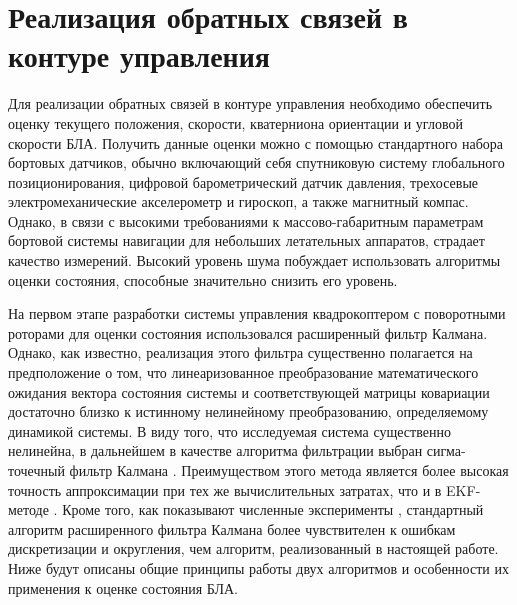 \chapter{Реализация обратных связей в контуре управления}

Для реализации обратных связей в контуре управления необходимо обеспечить оценку текущего положения, скорости, кватерниона ориентации и угловой скорости БЛА. Получить данные оценки можно с помощью стандартного набора бортовых датчиков, обычно включающий себя спутниковую систему глобального позиционирования, цифровой барометрический датчик давления, трехосевые электромеханические акселерометр и гироскоп, а также магнитный компас. Однако, в связи с высокими требованиями к массово-габаритным параметрам бортовой системы навигации для небольших летательных аппаратов, страдает качество измерений. Высокий уровень шума побуждает использовать алгоритмы оценки состояния, способные значительно снизить его уровень.

На первом этапе разработки системы управления квадрокоптером с поворотными роторами для оценки состояния использовался расширенный фильтр Калмана. Однако, как известно, реализация этого фильтра существенно полагается на предположение о том, что линеаризованное преобразование математического ожидания вектора состояния системы и соответствующей матрицы ковариации достаточно близко к истинному нелинейному преобразованию, определяемому динамикой системы. В виду того, что исследуемая система существенно нелинейна, в дальнейшем в качестве алгоритма фильтрации выбран сигма-точечный фильтр Калмана \cite{Julier01, Julier02}. Преимуществом этого метода является более высокая точность аппроксимации при тех же вычислительных затратах, что и в EKF-методе \cite{Kulikova01}. Кроме того, как показывают численные эксперименты \cite{Shavin01}, стандартный алгоритм расширенного фильтра Калмана более чувствителен к ошибкам дискретизации и округления, чем алгоритм, реализованный в настоящей работе. Ниже будут описаны общие принципы работы двух алгоритмов и особенности их применения к оценке состояния БЛА.

